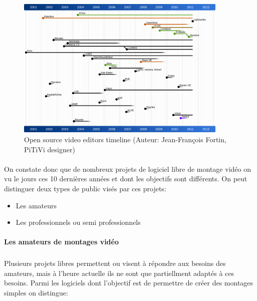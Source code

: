 \begin{figure} [h]
  \begin{center}
    \includegraphics[width=0.9\textwidth]{images/open-source-video-editor-timeline}
  \end{center} \caption{Open source video editors timeline (Auteur:
  Jean-François Fortin, PiTiVi designer)} \label{Yes}
\end{figure}

\paragraph{ }

On constate donc que de nombreux projets de logiciel libre de montage
vidéo on vu le jours ces 10 dernières années et dont les objectifs
sont différents.  On peut distinguer deux types de public visés par
ces projets:

\begin {itemize}

  \item {Les amateurs}

  \item {Les professionnels ou semi professionnels}
\end {itemize}

\paragraph {Les amateurs de montages vidéo}

\subparagraph{}

Plusieurs projets libres permettent ou visent à répondre aux besoins
des amateurs, mais à l'heure actuelle ils ne sont que partiellment
adaptés à ces besoins. Parmi les logiciels dont l'objectif est de
permettre de créer des montages simples on distingue:

